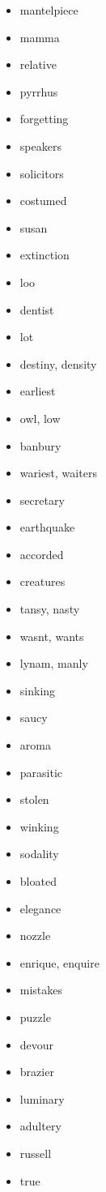\documentclass{article}
\begin{document}
\begin{itemize}
    \item mantelpiece
    \item mamma
    \item relative
    \item pyrrhus
    \item forgetting
    \item speakers
    \item solicitors
    \item costumed
    \item susan
    \item extinction
    \item loo
    \item dentist
    \item lot
    \item destiny, density
    \item earliest
    \item owl, low
    \item banbury
    \item wariest, waiters
    \item secretary
    \item earthquake
    \item accorded
    \item creatures
    \item tansy, nasty
    \item wasnt, wants
    \item lynam, manly
    \item sinking
    \item saucy
    \item aroma
    \item parasitic
    \item stolen
    \item winking
    \item sodality
    \item bloated
    \item elegance
    \item nozzle
    \item enrique, enquire
    \item mistakes
    \item puzzle
    \item devour
    \item brazier
    \item luminary
    \item adultery
    \item russell
    \item true

\end{itemize}
\end{document}
